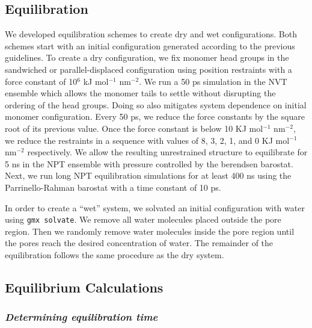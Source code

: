 \documentclass[journal=jpcbfk,manusciprt=article]{achemso}
\begin{document}
  \subsection{Equilibration}
  We developed equilibration schemes to create dry and wet configurations. Both
  schemes start with an initial configuration generated according to the previous
  guidelines. To create a dry configuration, we fix monomer head groups in the
  sandwiched or parallel-displaced configuration using position restraints with a
  force constant of 10$^6$ kJ mol$^{-1}$ nm$^{-2}$. We run a 50 ps simulation in
  the NVT ensemble which allows the monomer tails to settle without disrupting
  the ordering of the head groups. Doing so also mitigates system dependence on
  initial monomer configuration. Every 50 ps, we reduce the force constants by
  the square root of its previous value. Once the force constant is below 10 KJ
  mol$^{-1}$ nm$^{-2}$, we reduce the restraints in a sequence with values of
  8, 3, 2, 1, and 0 KJ mol$^{-1}$ nm$^{-2}$ respectively. We allow the resulting
  unrestrained structure to equilibrate for 5 ns in the NPT ensemble
  with pressure controlled by the berendsen barostat. Next, we run long NPT
  equilibration simulations for at least 400 ns using the Parrinello-Rahman
  barostat with a time constant of 10 ps.

  In order to create a ``wet'' system, we solvated an initial configuration with
  water using \texttt{gmx solvate}. We remove all water molecules placed outside
  the pore region. Then we randomly remove water molecules inside the pore region
  until the pores reach the desired concentration of water. The remainder of the
  equilibration follows the same procedure as the dry system. 

  \subsection{Equilibrium Calculations}

  \subsubsection{\textit{Determining equilibration time}}\label{method:equil_time}
\end{document}
